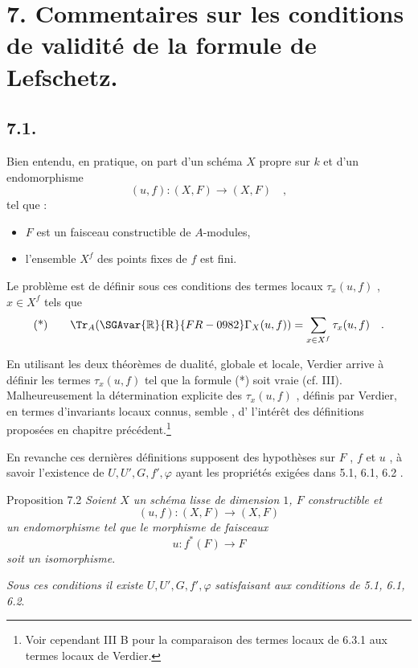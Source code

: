 \section*{7. Commentaires sur les conditions de validité de la formule de Lefschetz.}

\subsection*{7.1.}
Bien entendu, en pratique, on part d'un schéma $X$ propre sur $k$ et d'un endomorphisme
\[
(u, f) : (X, F) \longrightarrow (X, F) \quad ,
\]
tel que :
\begin{itemize}[label=-]
\item $F$ est un faisceau constructible de $A$-modules,
\item l'ensemble $X^f$ des points fixes de $f$ est fini.
\end{itemize}

Le problème est de définir sous ces conditions des termes locaux $\tau_x(u, f)$ , $x \in X^f$ tels que
\[
\text{(*)} \qquad \Tr_A(\SGAvar{\mathbb{R}}{\mathrm{R}}{FR-0982}\Gamma_X(u, f)) = \sum_{x \in X^f} \tau_x(u, f) \quad .
\]

En utilisant les deux théorèmes de dualité, globale et locale, Verdier arrive à définir les termes $\tau_x(u, f)$ tel que la formule (*) soit vraie (cf. III). Malheureusement la détermination explicite des $\tau_x(u, f)$ , définis par Verdier, en termes d'invariants locaux connus, semble , d' l'intérêt des définitions proposées en chapitre précédent.\footnote{Voir cependant III B pour la comparaison des termes locaux de 6.3.1 aux termes locaux de Verdier.}

En revanche ces dernières définitions supposent des hypothèses  sur $F$ , $f$ et $u$ , à savoir l'existence de $U, U', G, f', \varphi$ ayant les propriétés exigées dans 5.1, 6.1, 6.2 .


\begin{statement}{Proposition 7.2}
\emph{Soient $X$ un schéma lisse de dimension $1$, $F$ constructible et}
\[
(u,f):(X,F)\longrightarrow (X,F)
\]
\emph{un endomorphisme tel que le morphisme de faisceaux}
\[
u:f^*(F)\longrightarrow F
\]
\emph{soit un isomorphisme}.

\emph{Sous ces conditions il existe} $U,U',G,f',\varphi$ \emph{satisfaisant aux conditions de 5.1, 6.1, 6.2}.
\end{statement}

